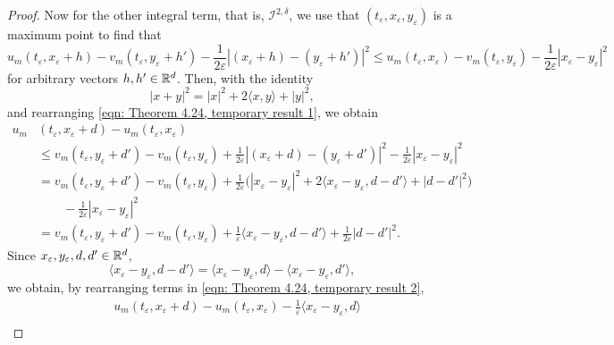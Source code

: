 \begin{proof}
    Now for the other integral term, that is, $\mathcal{I}^{2,\delta}$, we use that $(t_\varepsilon,x_\varepsilon,y_\varepsilon)$ is a maximum point to find that 
    \begin{equation}
        u_m(t_\varepsilon,x_\varepsilon+h) - v_m(t_\varepsilon,y_\varepsilon+h')  - \frac{1}{2 \varepsilon} |(x_\varepsilon + h) - (y_\varepsilon + h')|^2 \leq u_m(t_\varepsilon,x_\varepsilon)  - v_m(t_\varepsilon,y_\varepsilon) - \frac{1}{2\varepsilon} |x_\varepsilon-y_\varepsilon|^2
        \label{eqn: Theorem 4.24, temporary result 1}
    \end{equation}
    for arbitrary vectors $h, h' \in \mathbb{R}^d$. Then, with the identity
    \begin{equation*}
        |x+y|^2 = |x|^2 + 2 \langle x,y \rangle + |y|^2, 
    \end{equation*}
    and rearranging \eqref{eqn: Theorem 4.24, temporary result 1}, we obtain
    \begin{align}
        u_m&(t_\varepsilon,x_\varepsilon+d) - u_m(t_\varepsilon,x_\varepsilon)\nonumber \\
        & \leq v_m(t_\varepsilon,y_\varepsilon+d') - v_m(t_\varepsilon,y_\varepsilon) + \frac{1}{2\varepsilon} |(x_\varepsilon+d) - (y_\varepsilon+d')|^2 - \frac{1}{2\varepsilon}|x_\varepsilon-y_\varepsilon|^2 \nonumber \\
        &= v_m(t_\varepsilon, y_\varepsilon+d') - v_m(t_\varepsilon,y_\varepsilon) + \frac{1}{2\varepsilon} \big( |x_\varepsilon-y_\varepsilon|^2 + 2 \langle x_\varepsilon-y_\varepsilon,d-d' \rangle + |d-d'|^2 \big)\nonumber \\
        & \qquad - \frac{1}{2\varepsilon} |x_\varepsilon-y_\varepsilon|^2 \nonumber \\
        &= v_m(t_\varepsilon,y_\varepsilon+d') - v_m(t_\varepsilon,y_\varepsilon) + \frac{1}{\varepsilon} \langle x_\varepsilon-y_\varepsilon,d-d' \rangle + \frac{1}{2\varepsilon} |d-d'|^2.
        \label{eqn: Theorem 4.24, temporary result 2}
    \end{align}
    Since $x_\varepsilon,y_\varepsilon,d,d' \in \mathbb{R}^d$,
    \begin{equation*}
        \langle x_\varepsilon-y_\varepsilon, d-d' \rangle = \langle x_\varepsilon-y_\varepsilon,d \rangle - \langle x_\varepsilon-y_\varepsilon,d' \rangle,
    \end{equation*}
    we obtain, by rearranging terms in \eqref{eqn: Theorem 4.24, temporary result 2},
    \begin{align}
        & u_m(t_\varepsilon,x_\varepsilon+d) - u_m(t_\varepsilon,x_\varepsilon) - \frac{1}{\varepsilon}\langle x_\varepsilon-y_\varepsilon, d\rangle \nonumber \\

\end{align}
\end{proof}
